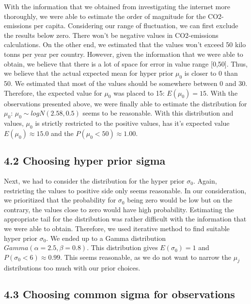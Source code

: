 \documentclass[
]{article}
\begin{document}
With the information that we obtained from investigating the internet
more thoroughly, we were able to estimate the order of magnitude for the
CO2-emissions per capita. Considering our range of fluctuation, we can
first exclude the results below zero. There won't be negative values in
CO2-emissions calculations. On the other end, we estimated that the
values won't exceed 50 kilo tonns per year per country. However, given
the information that we were able to obtain, we believe that there is a
lot of space for error in value range {[}0,50{]}. Thus, we believe that
the actual expected mean for hyper prior \(\mu_0\) is closer to 0 than
50. We estimated that most of the values should be somewhere between 0
and 30. Therefore, the expected value for \(\mu_0\) was placed to 15:
\(E(\mu_0) = 15\). With the observations presented above, we were
finally able to estimate the distribution for \(\mu_0\):
\(\mu_0 \sim logN(2.58, 0.5)\) seems to be reasonable. With this
distribution and values, \(\mu_0\) is strictly restricted to the
positive values, has it's expected value \(E(\mu_0) \approx 15.0\) and
the \(P(\mu_0 < 50) \approx 1.00\).

\hypertarget{choosing-hyper-prior-sigma}{%
\subsection{4.2 Choosing hyper prior
sigma}\label{choosing-hyper-prior-sigma}}

Next, we had to consider the distribution for the hyper prior
\(\sigma_0\). Again, restricting the values to positive side only seems
reasonable. In our consideration, we prioritized that the probability
for \(\sigma_0\) being zero would be low but on the contrary, the values
close to zero would have high probability. Estimating the appropriate
tail for the distribution was rather difficult with the information that
we were able to obtain. Therefore, we used iterative method to find
suitable hyper prior \(\sigma_0\). We ended up to a Gamma distribution
\(Gamma(\alpha = 2.5,\beta = 0.8)\). This distribution gives
\(E(\sigma_0) = 1\) and \(P(\sigma_0 < 6) \approx 0.99\). This seems
reasonable, as we do not want to narrow the \(\mu_j\) distributions too
much with our prior choices.

\hypertarget{choosing-common-sigma-for-observations}{%
\subsection{4.3 Choosing common sigma for
observations}\label{choosing-common-sigma-for-observations}}
\end{document}
